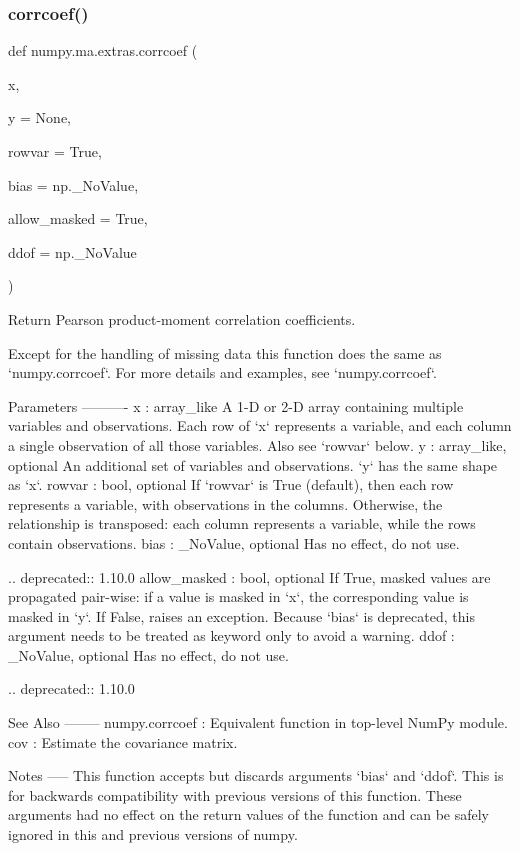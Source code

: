\subsubsection{\texorpdfstring{corrcoef()}{corrcoef()}}
{\footnotesize\ttfamily def numpy.\+ma.\+extras.\+corrcoef (\begin{DoxyParamCaption}\item[{}]{x,  }\item[{}]{y = {\ttfamily None},  }\item[{}]{rowvar = {\ttfamily True},  }\item[{}]{bias = {\ttfamily np.\+\_\+NoValue},  }\item[{}]{allow\+\_\+masked = {\ttfamily True},  }\item[{}]{ddof = {\ttfamily np.\+\_\+NoValue} }\end{DoxyParamCaption})}

\begin{DoxyVerb}Return Pearson product-moment correlation coefficients.

Except for the handling of missing data this function does the same as
`numpy.corrcoef`. For more details and examples, see `numpy.corrcoef`.

Parameters
----------
x : array_like
    A 1-D or 2-D array containing multiple variables and observations.
    Each row of `x` represents a variable, and each column a single
    observation of all those variables. Also see `rowvar` below.
y : array_like, optional
    An additional set of variables and observations. `y` has the same
    shape as `x`.
rowvar : bool, optional
    If `rowvar` is True (default), then each row represents a
    variable, with observations in the columns. Otherwise, the relationship
    is transposed: each column represents a variable, while the rows
    contain observations.
bias : _NoValue, optional
    Has no effect, do not use.

    .. deprecated:: 1.10.0
allow_masked : bool, optional
    If True, masked values are propagated pair-wise: if a value is masked
    in `x`, the corresponding value is masked in `y`.
    If False, raises an exception.  Because `bias` is deprecated, this
    argument needs to be treated as keyword only to avoid a warning.
ddof : _NoValue, optional
    Has no effect, do not use.

    .. deprecated:: 1.10.0

See Also
--------
numpy.corrcoef : Equivalent function in top-level NumPy module.
cov : Estimate the covariance matrix.

Notes
-----
This function accepts but discards arguments `bias` and `ddof`.  This is
for backwards compatibility with previous versions of this function.  These
arguments had no effect on the return values of the function and can be
safely ignored in this and previous versions of numpy.
\end{DoxyVerb}
 \mbox{\label{namespacenumpy_1_1ma_1_1extras_ae890e9b4743408c9ee60752e32c6a0b1}} 
